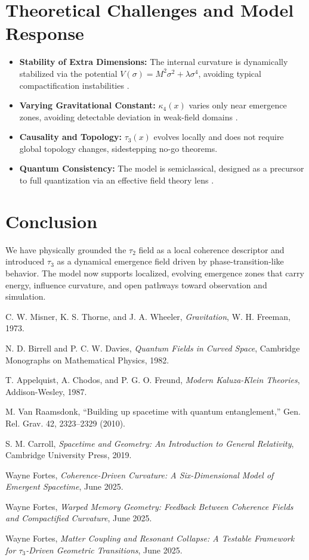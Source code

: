 \documentclass[12pt]{article}
\begin{document}
\section{Theoretical Challenges and Model Response}

\begin{itemize}
    \item \textbf{Stability of Extra Dimensions:} The internal curvature is dynamically stabilized via the potential $V(\sigma) = M^2\sigma^2 + \lambda\sigma^4$, avoiding typical compactification instabilities \cite{appelquist1987}.
    \item \textbf{Varying Gravitational Constant:} $\kappa_4(x)$ varies only near emergence zones, avoiding detectable deviation in weak-field domains \cite{carroll2019}.
    \item \textbf{Causality and Topology:} $\tau_3(x)$ evolves locally and does not require global topology changes, sidestepping no-go theorems.
    \item \textbf{Quantum Consistency:} The model is semiclassical, designed as a precursor to full quantization via an effective field theory lens \cite{misner1973}.
\end{itemize}

\section{Conclusion}

We have physically grounded the $\tau_2$ field as a local coherence descriptor and introduced $\tau_3$ as a dynamical emergence field driven by phase-transition-like behavior. The model now supports localized, evolving emergence zones that carry energy, influence curvature, and open pathways toward observation and simulation.

\begin{thebibliography}{9}
C. W. Misner, K. S. Thorne, and J. A. Wheeler, \textit{Gravitation}, W. H. Freeman, 1973.

N. D. Birrell and P. C. W. Davies, \textit{Quantum Fields in Curved Space}, Cambridge Monographs on Mathematical Physics, 1982.

T. Appelquist, A. Chodos, and P. G. O. Freund, \textit{Modern Kaluza-Klein Theories}, Addison-Wesley, 1987.

M. Van Raamsdonk, “Building up spacetime with quantum entanglement,” Gen. Rel. Grav. 42, 2323–2329 (2010).

S. M. Carroll, \textit{Spacetime and Geometry: An Introduction to General Relativity}, Cambridge University Press, 2019.

Wayne Fortes, \textit{Coherence-Driven Curvature: A Six-Dimensional Model of Emergent Spacetime}, June 2025.

Wayne Fortes, \textit{Warped Memory Geometry: Feedback Between Coherence Fields and Compactified Curvature}, June 2025.

Wayne Fortes, \textit{Matter Coupling and Resonant Collapse: A Testable Framework for $\tau_3$-Driven Geometric Transitions}, June 2025.
\end{thebibliography}
\end{document}
